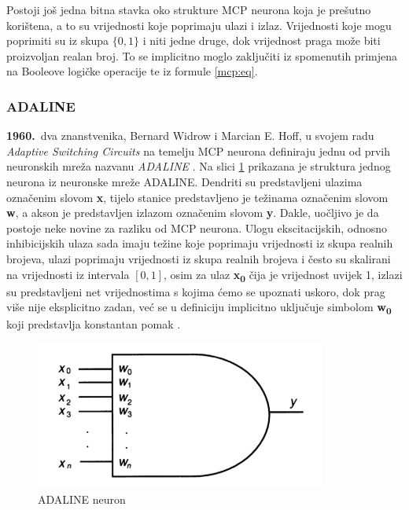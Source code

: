 \documentclass[times, utf8, zavrsni]{fer}
\begin{document}
Postoji još jedna bitna stavka oko strukture MCP neurona koja je prešutno korištena, a to su vrijednosti koje poprimaju ulazi i izlaz. Vrijednosti koje mogu poprimiti su iz skupa $\{0, 1\}$ i niti jedne druge, dok vrijednost praga može biti proizvoljan realan broj. To se implicitno moglo zaključiti iz spomenutih primjena na Booleove logičke operacije te iz formule \eqref{mcp:eq}.

\subsubsection{ADALINE}
\textbf{1960.}\ dva znanstvenika, Bernard Widrow i Marcian E. Hoff, u svojem radu \textit{Adaptive Switching Circuits} na temelju MCP neurona definiraju jednu od prvih neuronskih mreža nazvanu \textit{ADALINE} . Na slici \ref{fig:adaline-neuron} prikazana je struktura jednog neurona iz neuronske mreže ADALINE. Dendriti su predstavljeni ulazima označenim slovom \textbf{x}, tijelo stanice predstavljeno je težinama označenim slovom \textbf{w}, a akson je predstavljen izlazom označenim slovom \textbf{y}. Dakle, uočljivo je da postoje neke novine za razliku od MCP neurona. Ulogu ekscitacijskih, odnosno inhibicijskih ulaza sada imaju težine koje poprimaju vrijednosti iz skupa realnih brojeva, ulazi poprimaju vrijednosti iz skupa realnih brojeva i često su skalirani na vrijednosti iz intervala $[0,1]$, osim za ulaz \textbf{x\textsubscript{0}} čija je vrijednost uvijek 1, izlazi su predstavljeni net vrijednostima s kojima ćemo se upoznati uskoro, dok prag više nije eksplicitno zadan, već se u definiciju implicitno uključuje simbolom \textbf{w\textsubscript{0}} koji predstavlja konstantan pomak  \citep{picton2000}.

\begin{figure}[H]
    \centering
    \includegraphics{img/adaline-neuron.png}
    \caption[Caption for LOF]{ADALINE neuron\footnotemark}
    \label{fig:adaline-neuron}
\end{figure}
\end{document}
